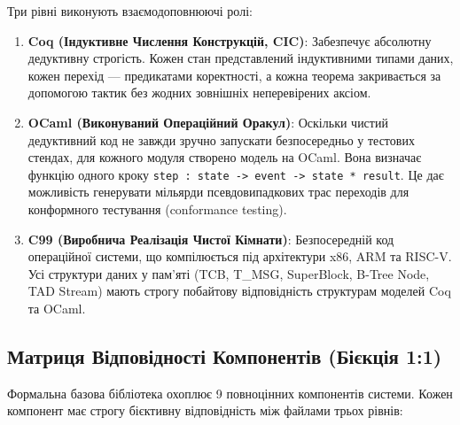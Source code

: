\documentclass{article}
\begin{document}
Три рівні виконують взаємодоповнюючі ролі:
\begin{enumerate}
  \item \textbf{Coq (Індуктивне Числення Конструкцій, CIC)}: Забезпечує абсолютну дедуктивну строгість. Кожен стан представлений індуктивними типами даних, кожен перехід --- предикатами коректності, а кожна теорема закривається за допомогою тактик без жодних зовнішніх неперевірених аксіом.
  \item \textbf{OCaml (Виконуваний Операційний Оракул)}: Оскільки чистий дедуктивний код не завжди зручно запускати безпосередньо у тестових стендах, для кожного модуля створено модель на OCaml. Вона визначає функцію одного кроку \texttt{step : state -> event -> state * result}. Це дає можливість генерувати мільярди псевдовипадкових трас переходів для конформного тестування (conformance testing).
  \item \textbf{C99 (Виробнича Реалізація Чистої Кімнати)}: Безпосередній код операційної системи, що компілюється під архітектури x86, ARM та RISC-V. Усі структури даних у пам'яті (TCB, T\_MSG, SuperBlock, B-Tree Node, TAD Stream) мають строгу побайтову відповідність структурам моделей Coq та OCaml.
\end{enumerate}

\subsection{Матриця Відповідності Компонентів (Бієкція 1:1)}

Формальна базова бібліотека охоплює 9 повноцінних компонентів системи. Кожен компонент має строгу бієктивну відповідність між файлами трьох рівнів:
\end{document}
